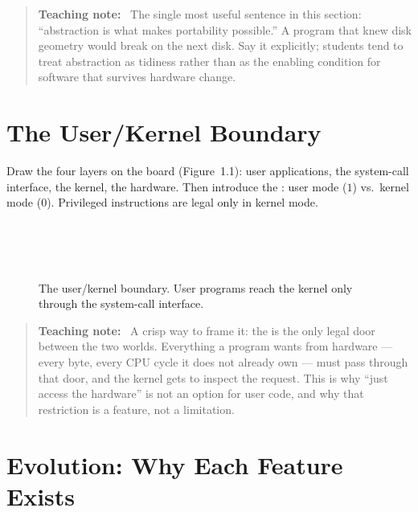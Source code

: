 \documentclass[11pt]{article}
\newenvironment{teachingaside}{\begin{quote}\small\color{primary-gold}\textbf{Teaching note:}\ }{\end{quote}}
\begin{document}
\begin{teachingaside}
The single most useful sentence in this section: ``abstraction is what makes portability possible.'' A program that knew disk geometry would break on the next disk. Say it explicitly; students tend to treat abstraction as tidiness rather than as the enabling condition for software that survives hardware change.
\end{teachingaside}

\section{The User/Kernel Boundary}

Draw the four layers on the board (Figure~1.1): user applications, the system-call interface, the kernel, the hardware. Then introduce the : user mode ($1$) vs.\ kernel mode ($0$). Privileged instructions are legal only in kernel mode.

\begin{figure}[h]
\centering
{}\\[0.25em]
\\[0.25em]
\\[0.25em]
\caption{The user/kernel boundary. User programs reach the kernel only through the system-call interface.}
\end{figure}

\begin{teachingaside}
A crisp way to frame it: the  is the only legal door between the two worlds. Everything a program wants from hardware --- every byte, every CPU cycle it does not already own --- must pass through that door, and the kernel gets to inspect the request. This is why ``just access the hardware'' is not an option for user code, and why that restriction is a feature, not a limitation.
\end{teachingaside}

\section{Evolution: Why Each Feature Exists}
\end{document}
